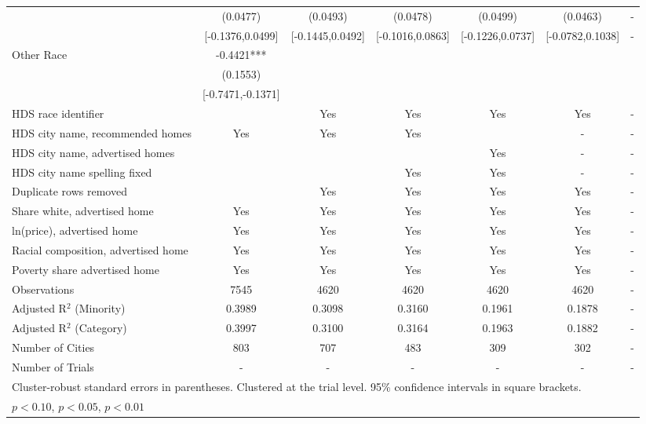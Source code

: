 \begin{table}[htbp]
{\begin{tabular}{l*{6}{c}}
 & (0.0477) & (0.0493) & (0.0478) & (0.0499) & (0.0463) & - \\
 & [-0.1376,0.0499] & [-0.1445,0.0492] & [-0.1016,0.0863] & [-0.1226,0.0737] & [-0.0782,0.1038] & - \\
Other Race & -0.4421*** &  &  &  &  &  \\
 & (0.1553) &  &  &  &  &  \\
 & [-0.7471,-0.1371] &  &  &  &  &  \\
\midrule
HDS race identifier & & Yes & Yes & Yes & Yes & - \\
HDS city name, recommended homes & Yes & Yes & Yes & & - & -\\
HDS city name, advertised homes &  &  &  & Yes & - & -\\
HDS city name spelling fixed & & & Yes & Yes & - & -\\
Duplicate rows removed &  & Yes & Yes & Yes & Yes & - \\
\midrule
Share white, advertised home  & Yes & Yes & Yes & Yes & Yes & - \\
ln(price), advertised home  & Yes & Yes & Yes & Yes & Yes & - \\
Racial composition, advertised home & Yes & Yes & Yes & Yes & Yes & - \\
Poverty share advertised home & Yes & Yes & Yes & Yes & Yes & - \\
Observations & 7545 & 4620 & 4620 & 4620 & 4620 & - \\
Adjusted R$^2$ (Minority) & 0.3989 & 0.3098 & 0.3160 & 0.1961 & 0.1878 & - \\
Adjusted R$^2$ (Category) & 0.3997 & 0.3100 & 0.3164 & 0.1963 & 0.1882 & - \\
Number of Cities & 803 & 707 & 483 & 309 & 302 & - \\
Number of Trials & - & - & - & - & - & - \\
\bottomrule
\multicolumn{7}{l}{\footnotesize Cluster-robust standard errors in parentheses. Clustered at the trial level. 95\% confidence intervals in square brackets.}\\
\multicolumn{7}{l}{\footnotesize \sym{*} \(p<0.10\), \sym{**} \(p<0.05\), \sym{***} \(p<0.01\)}\\
\end{tabular}
}
\end{table}

